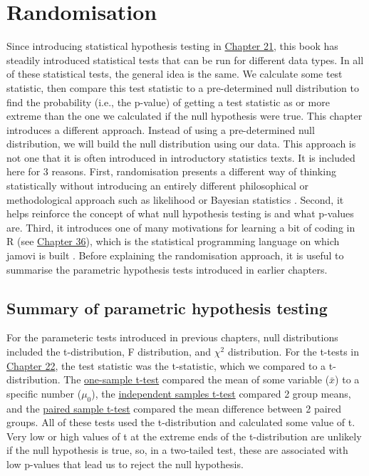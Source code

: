 \documentclass[
]{scrbook}
\begin{document}
\hypertarget{Chapter_35}{%
\chapter{Randomisation}\label{Chapter_35}}

Since introducing statistical hypothesis testing in \protect\hyperlink{Chapter_21}{Chapter 21}, this book has steadily introduced statistical tests that can be run for different data types.
In all of these statistical tests, the general idea is the same.
We calculate some test statistic, then compare this test statistic to a pre-determined null distribution to find the probability (i.e., the p-value) of getting a test statistic as or more extreme than the one we calculated if the null hypothesis were true.
This chapter introduces a different approach.
Instead of using a pre-determined null distribution, we will build the null distribution using our data.
This approach is not one that it is often introduced in introductory statistics texts.
It is included here for 3 reasons.
First, randomisation presents a different way of thinking statistically without introducing an entirely different philosophical or methodological approach such as likelihood \citep{Edwards1972} or Bayesian statistics \citep{Lee1997}.
Second, it helps reinforce the concept of what null hypothesis testing is and what p-values are.
Third, it introduces one of many motivations for learning a bit of coding in R (see \protect\hyperlink{Chapter_36}{Chapter 36}), which is the statistical programming language on which jamovi is built \citep{Jamovi2022, Rproject}.
Before explaining the randomisation approach, it is useful to summarise the parametric hypothesis tests introduced in earlier chapters.

\hypertarget{summary-of-parametric-hypothesis-testing}{%
\section{Summary of parametric hypothesis testing}\label{summary-of-parametric-hypothesis-testing}}

For the parameteric tests introduced in previous chapters, null distributions included the t-distribution, F distribution, and \(\chi^{2}\) distribution.
For the t-tests in \protect\hyperlink{Chapter_22}{Chapter 22}, the test statistic was the t-statistic, which we compared to a t-distribution.
The \protect\hyperlink{one-sample-t-test}{one-sample t-test} compared the mean of some variable (\(\bar{x}\)) to a specific number (\(\mu_{0}\)), the \protect\hyperlink{independent-samples-t-test}{independent samples t-test} compared 2 group means, and the \protect\hyperlink{paired-sample-t-test}{paired sample t-test} compared the mean difference between 2 paired groups.
All of these tests used the t-distribution and calculated some value of t.
Very low or high values of t at the extreme ends of the t-distribution are unlikely if the null hypothesis is true, so, in a two-tailed test, these are associated with low p-values that lead us to reject the null hypothesis.
\end{document}
